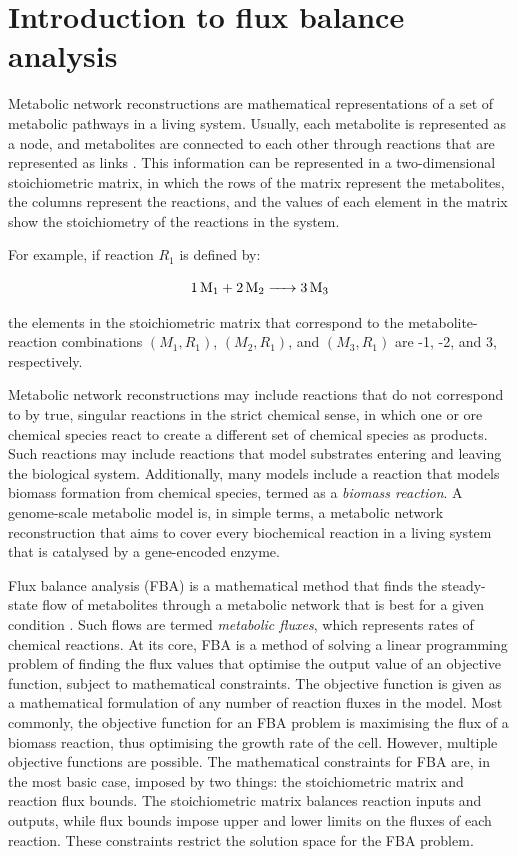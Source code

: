 \section{Introduction to flux balance analysis}
\label{sec:model-fba}

Metabolic network reconstructions are mathematical representations of a set of metabolic pathways in a living system.
Usually, each metabolite is represented as a node, and metabolites are connected to each other through reactions that are represented as links \parencite{palssonSystemsBiologyConstraintbased2015}.
This information can be represented in a two-dimensional stoichiometric matrix, in which the rows of the matrix represent the metabolites, the columns represent the reactions, and the values of each element in the matrix show the stoichiometry of the reactions in the system.

For example, if reaction $R_{1}$ is defined by:

\begin{equation}
  \ce{1 M1 + 2 M2 -> 3 M3}
  \label{eq:model-example-chemical-reaction}
\end{equation}

the elements in the stoichiometric matrix that correspond to the metabolite-reaction combinations $(M_{1}, R_{1})$, $(M_{2}, R_{1})$, and $(M_{3}, R_{1})$ are -1, -2, and 3, respectively.

Metabolic network reconstructions may include reactions that do not correspond to by true, singular reactions in the strict chemical sense, in which one or ore chemical species react to create a different set of chemical species as products.
Such reactions may include reactions that model substrates entering and leaving the biological system.
Additionally, many models include a reaction that models biomass formation from chemical species, termed as a \emph{biomass reaction}.
A genome-scale metabolic model is, in simple terms, a metabolic network reconstruction that aims to cover every biochemical reaction in a living system that is catalysed by a gene-encoded enzyme.

Flux balance analysis (FBA) is a mathematical method that finds the steady-state flow of metabolites through a metabolic network that is best for a given condition \parencite{orthWhatFluxBalance2010}.
Such flows are termed \emph{metabolic fluxes}, which represents rates of chemical reactions.
At its core, FBA is a method of solving a linear programming problem of finding the flux values that optimise the output value of an objective function, subject to mathematical constraints.
The objective function is given as a mathematical formulation of any number of reaction fluxes in the model.
Most commonly, the objective function for an FBA problem is maximising the flux of a biomass reaction, thus optimising the growth rate of the cell.
However, multiple objective functions are possible.
The mathematical constraints for FBA are, in the most basic case, imposed by two things:
the stoichiometric matrix and reaction flux bounds.
The stoichiometric matrix balances reaction inputs and outputs, while flux bounds impose upper and lower limits on the fluxes of each reaction.
These constraints restrict the solution space for the FBA problem.

